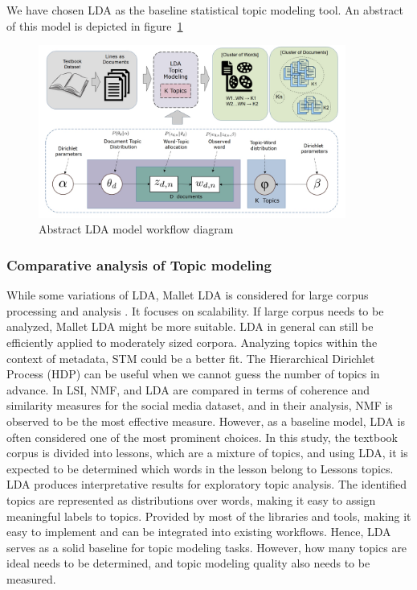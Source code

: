 \documentclass[sn-mathphys,Numbered]{sn-jnl}%
\theoremstyle{thmstyleone}%
\theoremstyle{thmstyletwo}%
\theoremstyle{thmstylethree}%
\begin{document}
We have chosen LDA as the baseline statistical topic modeling tool. An abstract of this model is depicted in figure~\ref{abstract_lda}
\begin{figure}[h!]
\centering
\includegraphics[width=0.9\textwidth]{lda.jpg}
\caption{Abstract LDA model workflow diagram}
\label{abstract_lda}
\end{figure}

\subsubsection{Comparative analysis of Topic modeling} 
While some variations of LDA, Mallet LDA is considered for large corpus processing and analysis \cite{vayansky2020review, abdelrazek2022topic, Comparison_Topic_Modeling_Algorithms}. It focuses on scalability. If large corpus needs to be analyzed, Mallet LDA might be more suitable. LDA in general can still be efficiently applied to moderately sized corpora. Analyzing topics within the context of metadata, STM could be a better fit. The Hierarchical Dirichlet Process (HDP) can be useful when we cannot guess the number of topics in advance. In \cite{Comparison_Topic_Modeling_Algorithms} LSI, NMF, and LDA are compared in terms of coherence and similarity measures for the social media dataset, and in their analysis, NMF is observed to be the most effective measure. However, as a baseline model, LDA is often considered one of the most prominent choices. In this study, the textbook corpus is divided into lessons, which are a mixture of topics, and using LDA, it is expected to be determined which words in the lesson belong to Lesson\textquotesingle s topics. LDA produces interpretative results for exploratory topic analysis. The identified topics are represented as distributions over words, making it easy to assign meaningful labels to topics. Provided by most of the libraries and tools, making it easy to implement and can be integrated into existing workflows. Hence, LDA serves as a solid baseline for topic modeling tasks. However, how many topics are ideal needs to be determined, and topic modeling quality also needs to be measured. 
\end{document}
